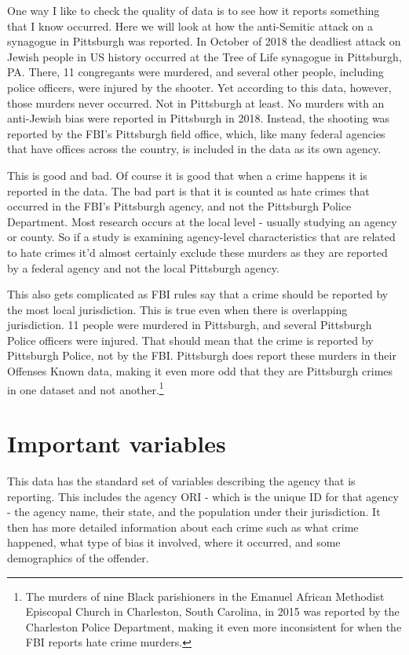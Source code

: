 \documentclass[
]{krantz}
\begin{document}
One way I like to check the quality of data is to see how it
reports something that I know occurred. Here we will look at
how the anti-Semitic attack on a synagogue in Pittsburgh was
reported. In October of 2018 the deadliest attack on Jewish
people in US history occurred at the Tree of Life synagogue
in Pittsburgh, PA. There, 11 congregants were murdered, and
several other people, including police officers, were
injured by the shooter. Yet according to this data, however,
those murders never occurred. Not in Pittsburgh at least. No
murders with an anti-Jewish bias were reported in Pittsburgh
in 2018. Instead, the shooting was reported by the FBI's
Pittsburgh field office, which, like many federal agencies
that have offices across the country, is included in the
data as its own agency.

This is good and bad. Of course it is good that when a crime
happens it is reported in the data. The bad part is that it
is counted as hate crimes that occurred in the FBI's
Pittsburgh agency, and not the Pittsburgh Police Department.
Most research occurs at the local level - usually studying
an agency or county. So if a study is examining agency-level
characteristics that are related to hate crimes it'd almost
certainly exclude these murders as they are reported by a
federal agency and not the local Pittsburgh agency.

This also gets complicated as FBI rules say that a crime
should be reported by the most local jurisdiction. This is
true even when there is overlapping jurisdiction. 11 people
were murdered in Pittsburgh, and several Pittsburgh Police
officers were injured. That should mean that the crime is
reported by Pittsburgh Police, not by the FBI. Pittsburgh
does report these murders in their Offenses Known data,
making it even more odd that they are Pittsburgh crimes in
one dataset and not another.\footnote{The murders of nine
  Black parishioners in the Emanuel African Methodist
  Episcopal Church in Charleston, South Carolina, in 2015
  was reported by the Charleston Police Department, making
  it even more inconsistent for when the FBI reports hate
  crime murders.}

\section{Important variables}\label{important-variables-6}

This data has the standard set of variables describing the
agency that is reporting. This includes the agency ORI -
which is the unique ID for that agency - the agency name,
their state, and the population under their jurisdiction. It
then has more detailed information about each crime such as
what crime happened, what type of bias it involved, where it
occurred, and some demographics of the offender.
\end{document}
